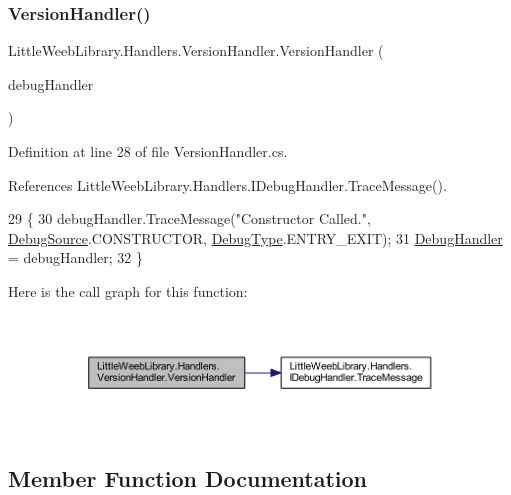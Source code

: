 \subsubsection{\texorpdfstring{Version\+Handler()}{VersionHandler()}}
{\footnotesize\ttfamily Little\+Weeb\+Library.\+Handlers.\+Version\+Handler.\+Version\+Handler (\begin{DoxyParamCaption}\item[{\mbox{\hyperlink{interface_little_weeb_library_1_1_handlers_1_1_i_debug_handler}{I\+Debug\+Handler}}}]{debug\+Handler }\end{DoxyParamCaption})}



Definition at line 28 of file Version\+Handler.\+cs.



References Little\+Weeb\+Library.\+Handlers.\+I\+Debug\+Handler.\+Trace\+Message().


\begin{DoxyCode}
29         \{
30             debugHandler.TraceMessage(\textcolor{stringliteral}{"Constructor Called."}, \mbox{\hyperlink{namespace_little_weeb_library_1_1_handlers_a2a6ca0775121c9c503d58aa254d292be}{DebugSource}}.CONSTRUCTOR, 
      \mbox{\hyperlink{namespace_little_weeb_library_1_1_handlers_ab66019ed40462876ec4e61bb3ccb0a62}{DebugType}}.ENTRY\_EXIT);
31             \mbox{\hyperlink{class_little_weeb_library_1_1_handlers_1_1_version_handler_a9d4e181ca6b1efff96f530dd7981d6e3}{DebugHandler}} = debugHandler;
32         \}
\end{DoxyCode}
Here is the call graph for this function\+:\nopagebreak
\begin{figure}[H]
\begin{center}
\leavevmode
\includegraphics[width=350pt]{class_little_weeb_library_1_1_handlers_1_1_version_handler_a51b31c85fe764e675c800d75b668f5d4_cgraph}
\end{center}
\end{figure}


\subsection{Member Function Documentation}
\mbox{\label{class_little_weeb_library_1_1_handlers_1_1_version_handler_ad4dc752be10a1b3cc2d546dc1d4d6bff}} 
